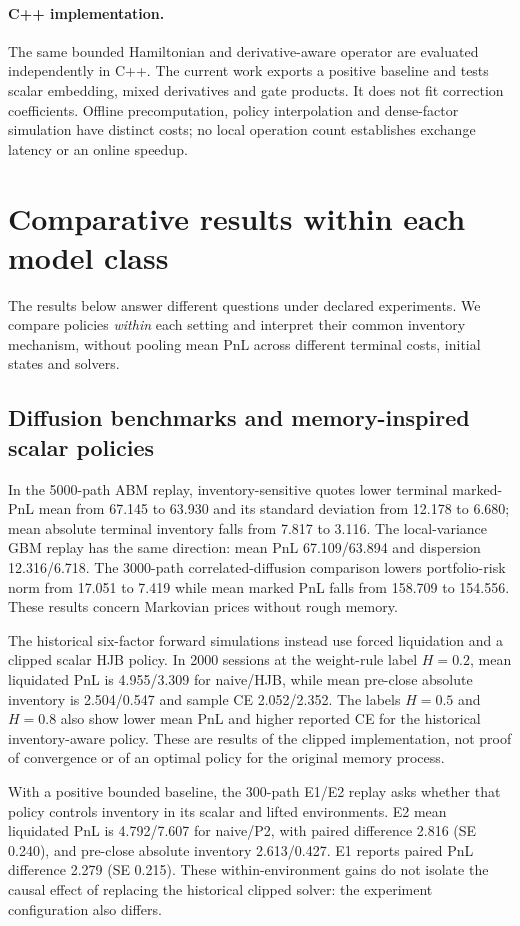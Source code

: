 \paragraph{C++ implementation.}
The same bounded Hamiltonian and derivative-aware operator are evaluated independently in C++. The current work exports a positive baseline and tests scalar embedding, mixed derivatives and gate products. It does not fit correction coefficients. Offline precomputation, policy interpolation and dense-factor simulation have distinct costs; no local operation count establishes exchange latency or an online speedup.

\section{Comparative results within each model class}
The results below answer different questions under declared experiments. We compare policies \emph{within} each setting and interpret their common inventory mechanism, without pooling mean PnL across different terminal costs, initial states and solvers.

\subsection{Diffusion benchmarks and memory-inspired scalar policies}
In the 5000-path ABM replay, inventory-sensitive quotes lower terminal marked-PnL mean from 67.145 to 63.930 and its standard deviation from 12.178 to 6.680; mean absolute terminal inventory falls from 7.817 to 3.116. The local-variance GBM replay has the same direction: mean PnL 67.109/63.894 and dispersion 12.316/6.718. The 3000-path correlated-diffusion comparison lowers portfolio-risk norm from 17.051 to 7.419 while mean marked PnL falls from 158.709 to 154.556. These results concern Markovian prices without rough memory.

The historical six-factor forward simulations instead use forced liquidation and a clipped scalar HJB policy. In 2000 sessions at the weight-rule label $H=0.2$, mean liquidated PnL is 4.955/3.309 for naive/HJB, while mean pre-close absolute inventory is 2.504/0.547 and sample CE 2.052/2.352. The labels $H=0.5$ and $H=0.8$ also show lower mean PnL and higher reported CE for the historical inventory-aware policy. These are results of the clipped implementation, not proof of convergence or of an optimal policy for the original memory process.

With a positive bounded baseline, the 300-path E1/E2 replay asks whether that policy controls inventory in its scalar and lifted environments. E2 mean liquidated PnL is 4.792/7.607 for naive/P2, with paired difference 2.816 (SE 0.240), and pre-close absolute inventory 2.613/0.427. E1 reports paired PnL difference 2.279 (SE 0.215). These within-environment gains do not isolate the causal effect of replacing the historical clipped solver: the experiment configuration also differs.


